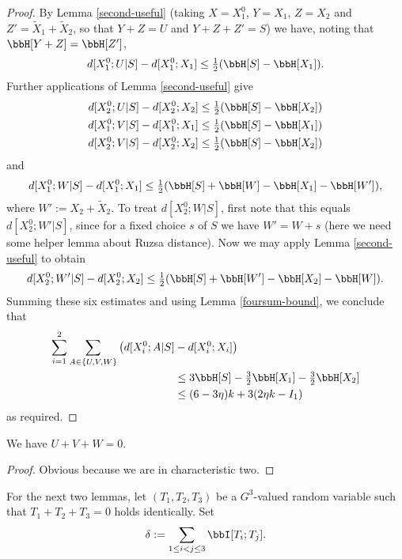 \begin{proof}
  \leanok
  By Lemma \ref{second-useful} (taking $X = X_1^0$, $Y = X_1$, $Z = X_2$ and $Z' = \tilde X_1 + \tilde X_2$, so that $Y + Z = U$ and $Y + Z + Z' = S$) we have, noting that $\bbH[Y+ Z] = \bbH[Z']$,
  \[
    d[X^0_1;U|S] - d[X^0_1;X_1] \leq \tfrac{1}{2} (\bbH[S] -  \bbH[X_1]).
  \]
  Further applications of Lemma \ref{second-useful} give
  \begin{align*}
  d[X^0_2;U|S] - d[X^0_2; X_2] &\leq \tfrac{1}{2} (\bbH[S] -  \bbH[X_2]) \\
  d[X^0_1;V|S] - d[X^0_1;X_1] &\leq \tfrac{1}{2} (\bbH[S] -  \bbH[X_1])\\
  d[X^0_2;V|S] - d[X^0_2;X_2] &\leq \tfrac{1}{2} (\bbH[S] -  \bbH[X_2])
  \end{align*}
  and
  \[d[X^0_1;W|S] - d[X^0_1;X_1] \leq \tfrac{1}{2} (\bbH[S] + \bbH[W] - \bbH[X_1] - \bbH[W']),\] where $W' := X_2 + \tilde X_2$.
  To treat $d[X^0_2;W|S]$, first note that this equals $d[X^0_2;W'|S]$, since for a fixed choice $s$ of $S$ we have $W' = W + s$ (here we need some helper lemma about Ruzsa distance). Now we may apply Lemma \ref{second-useful} to obtain
  \[d[X^0_2;W'|S] - d[X^0_2;X_2] \leq \tfrac{1}{2} (\bbH[S] + \bbH[W'] - \bbH[X_2] - \bbH[W]).\]
  Summing these six estimates and using Lemma \ref{foursum-bound}, we conclude that
  \begin{align*}
    \sum_{i=1}^2 \sum_{A\in\{U,V,W\}} \big(d[X^0_i;A|S] & - d[X^0_i;X_i]\big) \\
      &\leq 3 \bbH[S] - \tfrac{3}{2} \bbH[X_1] - \tfrac{3}{2} \bbH[X_2]\\
      &\leq (6 - 3\eta) k + 3(2 \eta k - I_1)
  \end{align*}
  as required.
\end{proof}

\begin{lemma}\label{key-ident}
\leanok
We have $U+V+W=0$.
\end{lemma}

\begin{proof} \leanok Obvious because we are in characteristic two.
\end{proof}

For the next two lemmas, let $(T_1,T_2,T_3)$ be a $G^3$-valued random variable such that $T_1+T_2+T_3=0$ holds identically. Set
\begin{equation}\label{delta-t1t2t3-def}
  \delta := \sum_{1 \leq i < j \leq 3} \bbI[T_i;T_j].
\end{equation}

